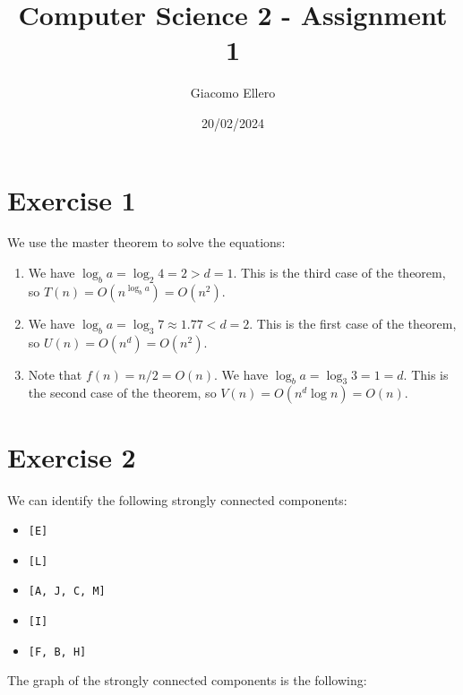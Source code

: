 \documentclass[10pt]{article}
\title{Computer Science 2 - Assignment 1}
\author{Giacomo Ellero}
\date{20/02/2024}
\begin{document}

\section*{Exercise 1}

We use the master theorem to solve the equations:

\begin{enumerate}
    \item We have $\log_b a = \log_2 4 = 2 > d = 1$. This is the third case of the theorem, so $T(n) = O(n^{\log_b a}) = O(n^2)$.
    \item We have $\log_b a = \log_3 7 \approx 1.77 < d = 2$. This is the first case of the theorem, so $U(n) = O(n^d) = O(n^2)$.
    \item Note that $f(n) = n/2 = O(n)$. We have $\log_b a = \log_3 3 = 1 = d$. This is the second case of the theorem, so $V(n) = O(n^d \log n) = O(n)$.
\end{enumerate}

\section*{Exercise 2}

We can identify the following strongly connected components:
\begin{itemize}
    \item \texttt{[E]}
    \item \texttt{[L]}
    \item \texttt{[A, J, C, M]}
    \item \texttt{[I]}
    \item \texttt{[F, B, H]}
\end{itemize}

The graph of the strongly connected components is the following:

\begin{center}
\end{center}
\end{document}
